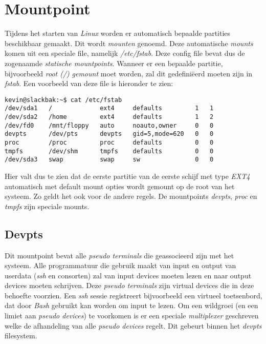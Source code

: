 \section{Mountpoint}
Tijdens het starten van \emph{Linux} worden er automatisch bepaalde partities beschikbaar gemaakt. Dit wordt \emph{mounten} genoemd. Deze automatische \emph{mounts} komen uit een speciale file, namelijk \emph{/etc/fstab}. Deze config file bevat dus de zogenaamde \emph{statische mountpoints}. Wanneer er een bepaalde partitie, bijvoorbeeld \emph{root (/)} \emph{gemount} moet worden, zal dit gedefini\"{e}erd moeten zijn in \emph{fstab}. Een voorbeeld van deze file is hieronder te zien: \index{/}
\begin{lstlisting}
kevin@slackbak:~$ cat /etc/fstab
/dev/sda1   /             ext4     defaults         1   1
/dev/sda2   /home         ext4     defaults         1   2
/dev/fd0    /mnt/floppy   auto     noauto,owner     0   0
devpts      /dev/pts      devpts   gid=5,mode=620   0   0
proc        /proc         proc     defaults         0   0
tmpfs       /dev/shm      tmpfs    defaults         0   0
/dev/sda3   swap          swap     sw               0   0
\end{lstlisting}%
Hier valt dus te zien dat de eerste partitie van de eerste schijf met type \emph{EXT4} automatisch met default mount opties wordt gemount op de root van het systeem. Zo geldt het ook voor de andere regels. De mountpoints \emph{devpts}, \emph{proc} en \emph{tmpfs} zijn speciale mounts. 

\subsection{Devpts}
Dit mountpoint bevat alle \emph{pseudo terminals} die geassocieerd zijn met het systeem. Alle programmatuur die gebruik maakt van input en output van userdata (\emph{ssh} en consorten) zal van input devices moeten lezen en naar output devices moeten schrijven. Deze \emph{pseudo terminals} zijn virtual devices die in deze behoefte voorzien. Een \emph{ssh} sessie registreert bijvoorbeeld een virtueel toetsenbord, dat door \emph{Bash} gebruikt kan worden om input te lezen. Om een wildgroei (en een limiet aan \emph{pseudo devices}) te voorkomen is er een speciale \emph{multiplexer} geschreven welke de afhandeling van alle \emph{pseudo devices} regelt. Dit gebeurt binnen het \emph{devpts} filesystem. 

